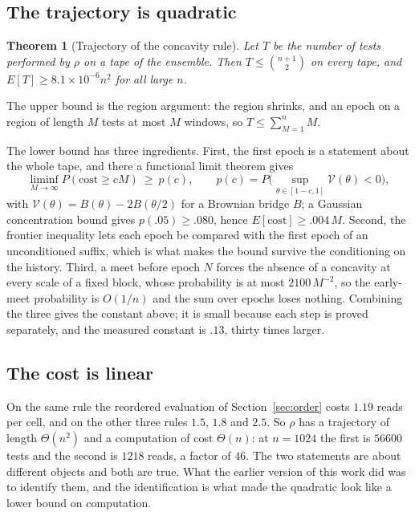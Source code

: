 \documentclass[11pt]{article}
\newtheorem{theorem}{Theorem}
\begin{document}
\subsection{The trajectory is quadratic}

\begin{theorem}[Trajectory of the concavity rule]\label{thm:trajectory}
Let $T$ be the number of tests performed by $\rho$ on a tape of the ensemble. Then
$T\le\binom{n+1}{2}$ on every tape, and $E[T]\ge 8.1\times10^{-6}n^2$ for all large $n$.
\end{theorem}

The upper bound is the region argument: the region shrinks, and an epoch on a region of
length $M$ tests at most $M$ windows, so $T\le\sum_{M=1}^{n}M$.

The lower bound has three ingredients. First, the first epoch is a statement about the whole
tape, and there a functional limit theorem gives
\[
\liminf_{M\to\infty}P(\mathrm{cost}\ge cM)\ \ge\ p(c),\qquad
p(c)=P\Big(\sup_{\theta\in[1-c,1]}\mathcal V(\theta)<0\Big),
\]
with $\mathcal V(\theta)=B(\theta)-2B(\theta/2)$ for a Brownian bridge $B$; a Gaussian
concentration bound gives $p(.05)\ge.080$, hence $E[\mathrm{cost}]\ge.004\,M$. Second, the
frontier inequality lets each epoch be compared with the first epoch of an unconditioned
suffix, which is what makes the bound survive the conditioning on the history. Third, a meet
before epoch $N$ forces the absence of a concavity at every scale of a fixed block, whose
probability is at most $2100\,M^{-2}$, so the early-meet probability is $O(1/n)$ and the sum
over epochs loses nothing. Combining the three gives the constant above; it is small because
each step is proved separately, and the measured constant is $.13$, thirty times larger.

\subsection{The cost is linear}

On the same rule the reordered evaluation of Section~\ref{sec:order} costs $1.19$ reads per
cell, and on the other three rules $1.5$, $1.8$ and $2.5$. So $\rho$ has a trajectory of
length $\Theta(n^2)$ and a computation of cost $\Theta(n)$: at $n=1024$ the first is
$56600$ tests and the second is $1218$ reads, a factor of $46$. The two statements are about
different objects and both are true. What the earlier version of this work did was to
identify them, and the identification is what made the quadratic look like a lower bound on
computation.
\end{document}
